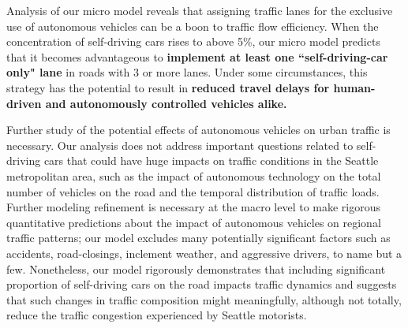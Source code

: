 Analysis of our micro model reveals that assigning traffic lanes for the exclusive use of autonomous vehicles can be a boon to traffic flow efficiency. When the concentration of self-driving cars rises to above 5\%, our micro model predicts that it becomes advantageous to \textbf{implement at least one ``self-driving-car only" lane} in roads with 3 or more lanes. Under some circumstances, this strategy has the potential to result in \textbf{reduced travel delays for human-driven and autonomously controlled vehicles alike.}

Further study of the potential effects of autonomous vehicles on urban traffic is necessary. Our analysis does not address important questions related to self-driving cars that could have huge impacts on traffic conditions in the Seattle metropolitan area, such as the impact of autonomous technology on the total number of vehicles on the road and the temporal distribution of traffic loads.  Further modeling refinement is necessary at the macro level to make rigorous quantitative predictions about the impact of autonomous vehicles on regional traffic patterns; our model excludes many potentially significant factors such as accidents, road-closings, inclement weather, and aggressive drivers, to name but a few. Nonetheless, our model rigorously demonstrates that including significant proportion of self-driving cars on the road impacts traffic dynamics and suggests that such changes in traffic composition might meaningfully, although not totally, reduce the traffic congestion experienced by Seattle motorists.
\newpage